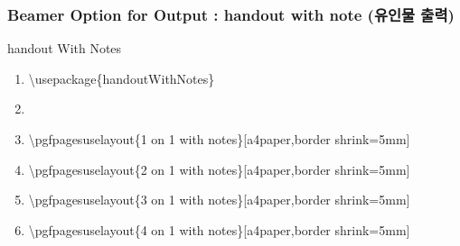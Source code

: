 \documentclass[ aspectratio=169,  10pt,blue,xcolor=pdftex,dvipsnames,table,handout,notes]{beamer}
\begin{document}

		\begin{frame}[t,shrink=10]
		\frametitle{Beamer Option for Output : handout with note (유인물 출력) }

			\begin{block} {handout With Notes}
			\begin{enumerate}
			\item[]	\textbackslash usepackage\{handoutWithNotes\}
			\item[]	
			\item[]	\textbackslash pgfpagesuselayout\{1 on 1 with notes\}[a4paper,border shrink=5mm]
			\item[]	\textbackslash pgfpagesuselayout\{2 on 1 with notes\}[a4paper,border shrink=5mm]
			\item[]	\textbackslash pgfpagesuselayout\{3 on 1 with notes\}[a4paper,border shrink=5mm]
			\item[]	\textbackslash pgfpagesuselayout\{4 on 1 with notes\}[a4paper,border shrink=5mm]

			\end{enumerate}
			\end{block}
		\end{frame}





















\end{document}
